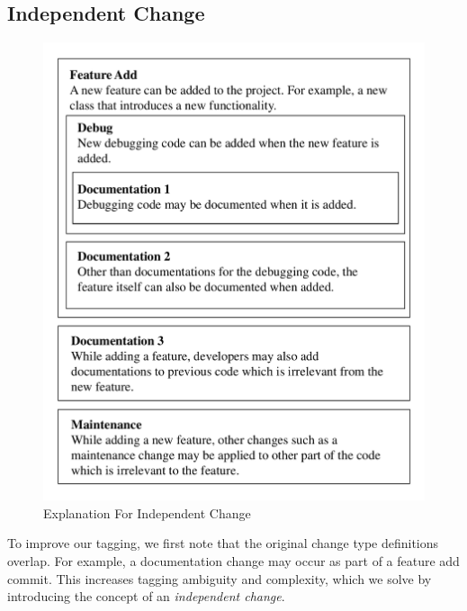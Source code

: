 \subsection{Independent Change}
\label{sec:independent}

\begin{figure}[htbp]
\centerline{\includegraphics[scale=0.5]{figures/independent_change.pdf}}
\caption{Explanation For Independent Change}
\label{fig:Relationship}
\end{figure}

To improve our tagging, we first note that the original change type definitions overlap. For example, a documentation change may occur as part of a feature add commit. This increases tagging ambiguity and complexity, which we solve by introducing the concept of an \textit{independent change}.


